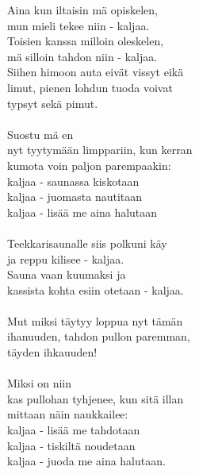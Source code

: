 
Aina kun iltaisin mä opiskelen, \\ mun mieli tekee niin - kaljaa. \\ Toisien kanssa milloin oleskelen, \\ mä silloin tahdon niin - kaljaa. \\ Siihen himoon auta eivät vissyt eikä \\ limut, pienen lohdun tuoda voivat \\ typsyt sekä pimut. \\ \hspace{10mm} \\ Suostu mä en \\ nyt tyytymään limppariin, kun kerran \\ kumota voin paljon parempaakin: \\ kaljaa - saunassa kiskotaan \\ kaljaa - juomasta nautitaan \\ kaljaa - lisää me aina halutaan \\ \hspace{10mm} \\ Teekkarisaunalle siis polkuni käy \\ ja reppu kilisee - kaljaa. \\ Sauna vaan kuumaksi ja \\ kassista kohta esiin otetaan - kaljaa. \\ \hspace{10mm} \\ Mut miksi täytyy loppua nyt tämän \\ ihanuuden, tahdon pullon paremman, \\ täyden ihkauuden! \\ \hspace{10mm} \\ Miksi on niin \\ kas pullohan tyhjenee, kun sitä illan \\ mittaan näin naukkailee: \\ kaljaa - lisää me tahdotaan \\ kaljaa - tiskiltä noudetaan \\ kaljaa - juoda me aina halutaan.
